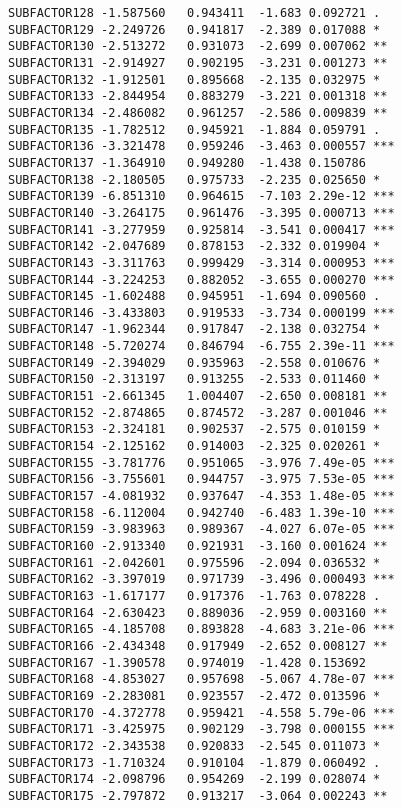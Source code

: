 \documentclass[]{book}
\begin{document}
\begin{verbatim}
SUBFACTOR128 -1.587560   0.943411  -1.683 0.092721 .  
SUBFACTOR129 -2.249726   0.941817  -2.389 0.017088 *  
SUBFACTOR130 -2.513272   0.931073  -2.699 0.007062 ** 
SUBFACTOR131 -2.914927   0.902195  -3.231 0.001273 ** 
SUBFACTOR132 -1.912501   0.895668  -2.135 0.032975 *  
SUBFACTOR133 -2.844954   0.883279  -3.221 0.001318 ** 
SUBFACTOR134 -2.486082   0.961257  -2.586 0.009839 ** 
SUBFACTOR135 -1.782512   0.945921  -1.884 0.059791 .  
SUBFACTOR136 -3.321478   0.959246  -3.463 0.000557 ***
SUBFACTOR137 -1.364910   0.949280  -1.438 0.150786    
SUBFACTOR138 -2.180505   0.975733  -2.235 0.025650 *  
SUBFACTOR139 -6.851310   0.964615  -7.103 2.29e-12 ***
SUBFACTOR140 -3.264175   0.961476  -3.395 0.000713 ***
SUBFACTOR141 -3.277959   0.925814  -3.541 0.000417 ***
SUBFACTOR142 -2.047689   0.878153  -2.332 0.019904 *  
SUBFACTOR143 -3.311763   0.999429  -3.314 0.000953 ***
SUBFACTOR144 -3.224253   0.882052  -3.655 0.000270 ***
SUBFACTOR145 -1.602488   0.945951  -1.694 0.090560 .  
SUBFACTOR146 -3.433803   0.919533  -3.734 0.000199 ***
SUBFACTOR147 -1.962344   0.917847  -2.138 0.032754 *  
SUBFACTOR148 -5.720274   0.846794  -6.755 2.39e-11 ***
SUBFACTOR149 -2.394029   0.935963  -2.558 0.010676 *  
SUBFACTOR150 -2.313197   0.913255  -2.533 0.011460 *  
SUBFACTOR151 -2.661345   1.004407  -2.650 0.008181 ** 
SUBFACTOR152 -2.874865   0.874572  -3.287 0.001046 ** 
SUBFACTOR153 -2.324181   0.902537  -2.575 0.010159 *  
SUBFACTOR154 -2.125162   0.914003  -2.325 0.020261 *  
SUBFACTOR155 -3.781776   0.951065  -3.976 7.49e-05 ***
SUBFACTOR156 -3.755601   0.944757  -3.975 7.53e-05 ***
SUBFACTOR157 -4.081932   0.937647  -4.353 1.48e-05 ***
SUBFACTOR158 -6.112004   0.942740  -6.483 1.39e-10 ***
SUBFACTOR159 -3.983963   0.989367  -4.027 6.07e-05 ***
SUBFACTOR160 -2.913340   0.921931  -3.160 0.001624 ** 
SUBFACTOR161 -2.042601   0.975596  -2.094 0.036532 *  
SUBFACTOR162 -3.397019   0.971739  -3.496 0.000493 ***
SUBFACTOR163 -1.617177   0.917376  -1.763 0.078228 .  
SUBFACTOR164 -2.630423   0.889036  -2.959 0.003160 ** 
SUBFACTOR165 -4.185708   0.893828  -4.683 3.21e-06 ***
SUBFACTOR166 -2.434348   0.917949  -2.652 0.008127 ** 
SUBFACTOR167 -1.390578   0.974019  -1.428 0.153692    
SUBFACTOR168 -4.853027   0.957698  -5.067 4.78e-07 ***
SUBFACTOR169 -2.283081   0.923557  -2.472 0.013596 *  
SUBFACTOR170 -4.372778   0.959421  -4.558 5.79e-06 ***
SUBFACTOR171 -3.425975   0.902129  -3.798 0.000155 ***
SUBFACTOR172 -2.343538   0.920833  -2.545 0.011073 *  
SUBFACTOR173 -1.710324   0.910104  -1.879 0.060492 .  
SUBFACTOR174 -2.098796   0.954269  -2.199 0.028074 *  
SUBFACTOR175 -2.797872   0.913217  -3.064 0.002243 ** 

\end{verbatim}
\end{document}
